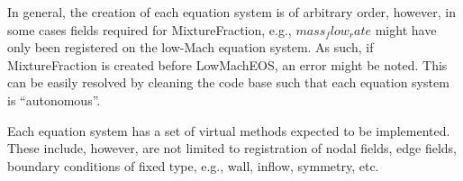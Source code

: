 In general, the creation of each equation system is of arbitrary order, however, in some cases
fields required for MixtureFraction, e.g., $mass_flow_rate$ might have only been registered
on the low-Mach equation system. As such, if MixtureFraction is created before LowMachEOS,
an error might be noted. This can be easily resolved by cleaning the code base such that
each equation system is ``autonomous''.

Each equation system has a set of virtual methods expected to be implemented. These include, however, are not limited to registration of nodal fields, edge fields, boundary conditions of fixed
type, e.g., wall, inflow, symmetry, etc.

